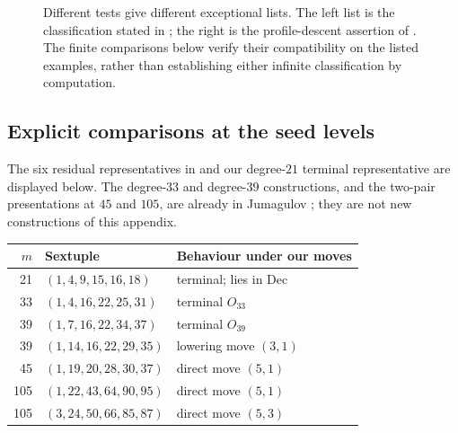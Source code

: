 \begin{figure}[t]
\centering
{}
\caption{Different tests give different exceptional lists. The left list
is the classification stated in \cite{Li26b}; the right is the
profile-descent assertion of . The finite comparisons
below verify their compatibility on the listed examples, rather than
establishing either infinite classification by computation.}
\label{fig:li-comparison}
\end{figure}

\subsection{Explicit comparisons at the seed levels}
The six residual representatives in \cite[(3.1)]{Li26b} and our
degree-$21$ terminal representative are displayed below. The degree-$33$
and degree-$39$ constructions, and the two-pair presentations at $45$
and $105$, are already in Jumagulov \cite[Theorems~1.2--1.4]{Jum26};
they are not new constructions of this appendix.

\begin{center}\small
\begin{tabular}{rll}
\toprule
$m$ & Sextuple & Behaviour under our moves\\
\midrule
21 & $(1,4,9,15,16,18)$ & terminal; lies in $\mathrm{Dec}$\\
33 & $(1,4,16,22,25,31)$ & terminal $O_{33}$\\
39 & $(1,7,16,22,34,37)$ & terminal $O_{39}$\\
39 & $(1,14,16,22,29,35)$ & lowering move $(3,1)$\\
45 & $(1,19,20,28,30,37)$ & direct move $(5,1)$\\
105 & $(1,22,43,64,90,95)$ & direct move $(5,1)$\\
105 & $(3,24,50,66,85,87)$ & direct move $(5,3)$\\
\bottomrule
\end{tabular}
\end{center}

